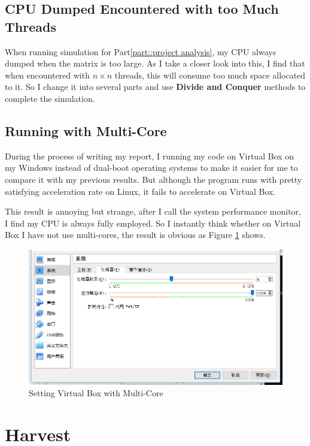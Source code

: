 \documentclass[12pt,a4paper]{article}
\begin{document}
\subsection{CPU Dumped Encountered with too Much Threads}
When running simulation for Part\ref{part::project analysis}, my CPU always dumped when the matrix is too large. As I take a closer look into this, I find that when encountered with $n\times n$ threads, this will consume too much space allocated to it. So I change it into several parts and use \textbf{Divide and Conquer} methods to complete the simulation.

\subsection{Running with Multi-Core}
During the process of writing my report, I running my code on Virtual Box on my Windows instead of dual-boot operating systems to make it easier for me to compare it with my previous results. But although the program runs with pretty satisfying acceleration rate on Linux, it fails to accelerate on Virtual Box.

This result is annoying but strange, after I call the system performance monitor, I find my CPU is always fully employed. So I instantly think whether on Virtual Box I have not use multi-cores, the result is obvious as Figure \ref{fig::multi-core} shows.

\begin{figure}[H]
	\centering
	\includegraphics[scale= 0.4]{./fig/setting.png}
	\caption{Setting Virtual Box with Multi-Core}
	\label{fig::multi-core}
\end{figure}
\section{Harvest}
\end{document}

